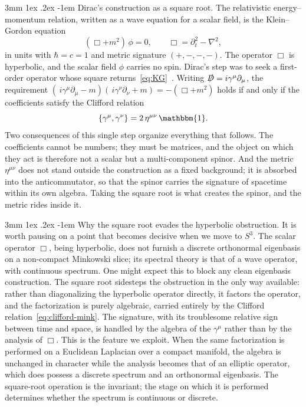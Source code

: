 \documentclass[%
 reprint, amsmath,amssymb, aps, prb, ]{revtex4-2}
\makeatletter
\newcommand{\unit}{\mathbbm{1}}%
\newcommand{\unit}{\mathds{1}}%
\newcommand{\unit}{\mathbf{1}}%
\numberwithin{equation}{section}
\renewcommand\paragraph{%
  \@startsection{paragraph}{4}{\z@}%
    {3mm \@plus 1ex \@minus .2ex}%
    {-1em}%
    {\normalfont\normalsize\itshape}}
\makeatother
\begin{document}
\paragraph{Dirac's construction as a square root.}
The relativistic energy--momentum relation, written as a wave equation for a scalar field, is the Klein--Gordon equation
\begin{equation}
\label{eq:KG}
(\Box + m^{2})\,\phi = 0,
\qquad
\Box = \partial_{t}^{2} - \nabla^{2},
\end{equation}
in units with $\hbar=c=1$ and metric signature $(+,-,-,-)$. The operator $\Box$ is hyperbolic, and the scalar field $\phi$ carries no spin. Dirac's step was to seek a first-order operator whose square returns~\eqref{eq:KG}~\cite{Dirac1928}. Writing $\slashed{D}=i\gamma^{\mu}\partial_{\mu}$, the requirement $(\,i\gamma^{\mu}\partial_{\mu}-m)(\,i\gamma^{\nu}\partial_{\nu}+m) = -(\Box+m^{2})$ holds if and only if the coefficients satisfy the Clifford relation
\begin{equation}
\label{eq:clifford-mink}
\{\gamma^{\mu},\gamma^{\nu}\} = 2\,\eta^{\mu\nu}\, \unit.
\end{equation}
Two consequences of this single step organize everything that follows. The coefficients cannot be numbers; they must be matrices, and the object on which they act is therefore not a scalar but a multi-component spinor. And the metric $\eta^{\mu\nu}$ does not stand outside the construction as a fixed background; it is absorbed into the anticommutator, so that the spinor carries the signature of spacetime within its own algebra. Taking the square root is what creates the spinor, and the metric rides inside it.

\paragraph{Why the square root evades the hyperbolic obstruction.}
It is worth pausing on a point that becomes decisive when we move to $S^{3}$. The scalar operator $\Box$, being hyperbolic, does not furnish a discrete orthonormal eigenbasis on a non-compact Minkowski slice; its spectral theory is that of a wave operator, with continuous spectrum. One might expect this to block any clean eigenbasis construction. The square root sidesteps the obstruction in the only way available: rather than diagonalizing the hyperbolic operator directly, it factors the operator, and the factorization is purely algebraic, carried entirely by the Clifford relation~\eqref{eq:clifford-mink}. The signature, with its troublesome relative sign between time and space, is handled by the algebra of the $\gamma^{\mu}$ rather than by the analysis of $\Box$. This is the feature we exploit. When the same factorization is performed on a Euclidean Laplacian over a compact manifold, the algebra is unchanged in character while the analysis becomes that of an elliptic operator, which does possess a discrete spectrum and an orthonormal eigenbasis. The square-root operation is the invariant; the stage on which it is performed determines whether the spectrum is continuous or discrete.
\end{document}

